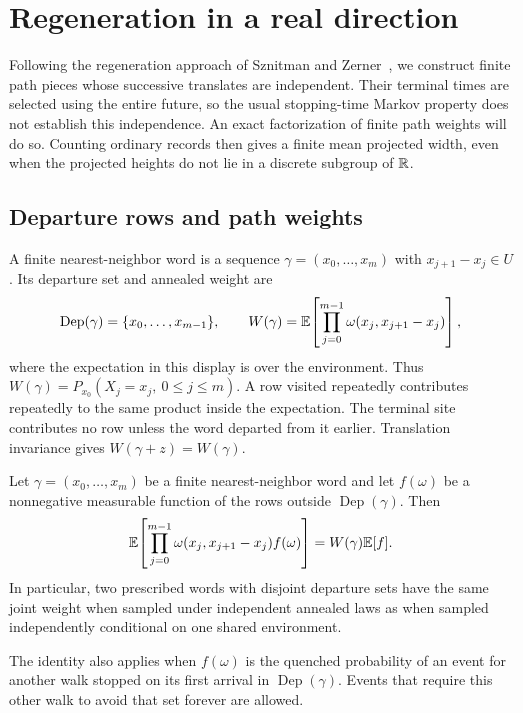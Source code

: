 \section{Regeneration in a real direction}\label{sec:regeneration}

Following the regeneration approach of Sznitman and
Zerner~\cite{SznitmanZerner1999}, we construct finite path pieces whose
successive translates are independent.  Their terminal times are selected using the entire future, so the usual
stopping-time Markov property does not establish this independence.  An exact
factorization of finite path weights will do so.  Counting ordinary records
then gives a finite mean projected width, even when the projected heights do
not lie in a discrete subgroup of $\mathbb R$.

\subsection{Departure rows and path weights}

A finite nearest-neighbor word is a sequence
$\gamma=(x_0,\ldots,x_m)$ with $x_{j+1}-x_j\in U$.  Its departure set and
annealed weight are
\[
 \operatorname{Dep}(\gamma)=\{x_0,\ldots,x_{m-1}\},\qquad
 W(\gamma)=\mathbb E\!\left[
       \prod_{j=0}^{m-1}\omega(x_j,x_{j+1}-x_j)\right],
\]
where the expectation in this display is over the environment.  Thus
$W(\gamma)=P_{x_0}(X_j=x_j,\ 0\le j\le m)$.  A row visited repeatedly
contributes repeatedly to the same product inside the expectation.  The
terminal site contributes no row unless the word departed from it earlier.
Translation invariance gives $W(\gamma+z)=W(\gamma)$.

\begin{lemma}
\label{lem:departure-transfer}
Let $\gamma=(x_0,\ldots,x_m)$ be a finite nearest-neighbor word and let
$f(\omega)$ be a nonnegative measurable function of the rows outside
$\operatorname{Dep}(\gamma)$.  Then
\begin{equation}\label{eq:departure-transfer}
 \mathbb E\!\left[
   \prod_{j=0}^{m-1}\omega(x_j,x_{j+1}-x_j)f(\omega)\right]
       =W(\gamma)\mathbb E[f].
\end{equation}
In particular, two prescribed words with disjoint departure sets have the
same joint weight when sampled under independent annealed laws as when
sampled independently conditional on one shared environment.

The identity also applies when $f(\omega)$ is the quenched probability of an
event for another walk stopped on its first arrival in
$\operatorname{Dep}(\gamma)$.  Events that require this other walk to avoid
that set forever are allowed.
\end{lemma}

